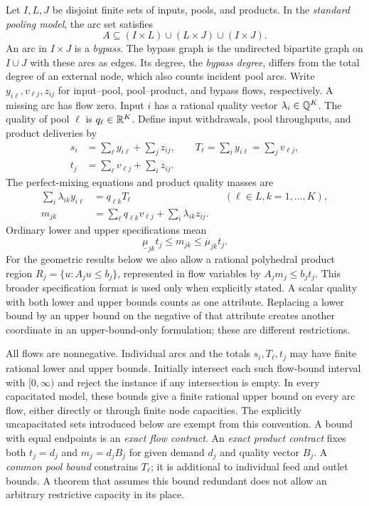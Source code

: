 Let $I,L,J$ be disjoint finite sets of inputs, pools, and products.
In the \emph{standard pooling model}, the arc set satisfies
\[
 A\subseteq(I\times L)\cup(L\times J)\cup(I\times J).
\]
An arc in $I\times J$ is a \emph{bypass}. The bypass graph is the
undirected bipartite graph on $I\cup J$ with these arcs as edges.
Its degree, the \emph{bypass degree}, differs from the total degree of
an external node, which also counts incident pool arcs. Write $y_{i\ell},v_{\ell j},z_{ij}$ for
input--pool, pool--product, and bypass flows, respectively. A missing arc
has flow zero. Input $i$ has a rational quality vector
$\lambda_i\in\mathbb Q^K$. The quality of pool $\ell$ is $q_\ell\in\mathbb R^K$.
Define input withdrawals, pool throughputs, and product deliveries by
\begin{align}
 s_i&=\sum_\ell y_{i\ell}+\sum_jz_{ij},\qquad
 T_\ell=\sum_i y_{i\ell}=\sum_jv_{\ell j},\label{s1:mass}\\
 t_j&=\sum_\ell v_{\ell j}+\sum_i z_{ij}.
\end{align}
The perfect-mixing equations and product quality masses are
\begin{align}
 \sum_i\lambda_{ik}y_{i\ell}&=q_{\ell k}T_\ell
       &&(\ell\in L, k=1,\ldots,K),\label{s1:mixing}\\
 m_{jk}&=\sum_\ell q_{\ell k}v_{\ell j}
                +\sum_i\lambda_{ik}z_{ij}.
\end{align}
Ordinary lower and upper specifications mean
\begin{equation}
 \underline\mu_{jk}t_j\le m_{jk}\le\overline\mu_{jk}t_j.
 \label{s1:quality}
\end{equation}
For the geometric results below we also allow a rational polyhedral
product region $R_j=\{u:A_ju\le b_j\}$, represented in flow variables by
$A_jm_j\le b_jt_j$. This broader specification format is used only when
explicitly stated. A scalar quality with both lower and upper bounds
counts as one attribute. Replacing a lower bound by an upper bound on the
negative of that attribute creates another coordinate in an
upper-bound-only formulation; these are different restrictions.

All flows are nonnegative. Individual arcs and the totals $s_i,T_\ell,t_j$
may have finite rational lower and upper bounds. Initially intersect
each such flow-bound interval with $[0,\infty)$ and reject the instance
if any intersection is empty. In every capacitated
model, these bounds give a finite rational upper bound on every arc flow,
either directly or through finite node capacities. The explicitly
uncapacitated sets introduced below are exempt from this convention.
A bound with equal
endpoints is an \emph{exact flow contract}. An \emph{exact product
contract} fixes both $t_j=d_j$ and $m_j=d_jB_j$ for given demand $d_j$
and quality vector $B_j$. A \emph{common pool bound} constrains $T_\ell$;
it is additional to individual feed and outlet bounds. A theorem that
assumes this bound redundant does not allow an arbitrary restrictive
capacity in its place.

